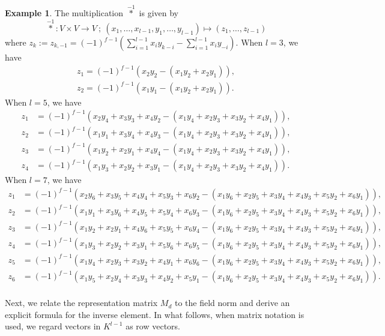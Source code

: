 \documentclass[a4paper, 11pt]{amsart}
\theoremstyle{plain}
\theoremstyle{definition}
\newtheorem{example}[thm]{Example}
\numberwithin{equation}{section}
\begin{document}
\begin{example}
The multiplication $\overset{-1}{\ast}$ is given by 
\[
\overset{-1}{\ast} : V \times V \to V\ ; \ ( x_1 , \dots , x_{l-1}, y_1 , \dots , y_{l-1} ) \mapsto (z_1 , \dots , z_{l-1})
\]
where $z_{k} := z_{k,-1} = (-1)^{f-1}\left(\sum_{i=1}^{l-1}x_{i}y_{k-i} - \sum_{i=1}^{l-1}x_{i}y_{-i}\right)$.
When $l=3$, we have
\begin{align*}
z_{1}
=(-1)^{f-1} (x_2y_2 - (x_1y_2 + x_2y_1)),\\
z_{2}
=(-1)^{f-1} (x_1y_1 - (x_1y_2 + x_2y_1)).
\end{align*}
When $l=5$, we have
\begin{align*}
z_{1}
&=(-1)^{f-1}( x_2y_4 + x_3y_3 + x_4y_2
-(x_1y_4 + x_2y_3 + x_3y_2 + x_4y_1 )),\\
z_{2}
&=(-1)^{f-1}(x_1y_1 + x_3y_4 + x_4y_3
-(x_1y_4 + x_2y_3 + x_3y_2 + x_4y_1 )),\\
z_{3}
&=(-1)^{f-1}(x_1y_2 + x_2y_1 + x_4y_4
-(x_1y_4 + x_2y_3 + x_3y_2 + x_4y_1 )),\\
z_{4}
&=(-1)^{f-1}(x_1y_3 + x_2y_2 + x_3y_1
-(x_1y_4 + x_2y_3 + x_3y_2 + x_4y_1 )).
\end{align*}
When $l=7$, we have
\begin{align*}
z_{1}
&=(-1)^{f-1}( x_2y_6 + x_3y_5 + x_4y_4 + x_5y_3 + x_6y_2
-(x_1y_6 + x_2y_5 + x_3y_4 + x_4y_3 + x_5y_2 + x_6y_1 )),\\
z_{2}
&=(-1)^{f-1}( x_1y_1 +  x_3y_6 + x_4y_5 + x_5y_4 + x_6y_3
-(x_1y_6 + x_2y_5 + x_3y_4 + x_4y_3 + x_5y_2 + x_6y_1 )),\\
z_{3}
&=(-1)^{f-1}( x_1y_2 + x_2y_1 +  x_4y_6 + x_5y_5 + x_6y_4
-(x_1y_6 + x_2y_5 + x_3y_4 + x_4y_3 + x_5y_2 + x_6y_1 )),\\
z_{4}
&=(-1)^{f-1}( x_1y_3 + x_2y_2 + x_3y_1 + x_5y_6 + x_6y_5
-(x_1y_6 + x_2y_5 + x_3y_4 + x_4y_3 + x_5y_2 + x_6y_1 )),\\
z_{5}
&=(-1)^{f-1}( x_1y_4 + x_2y_3 + x_3y_2 + x_4y_1 + x_6y_6
-(x_1y_6 + x_2y_5 + x_3y_4 + x_4y_3 + x_5y_2 + x_6y_1 )),\\
z_{6}
&=(-1)^{f-1}( x_1y_5 + x_2y_4 + x_3y_3 + x_4y_2 + x_5y_1 
-(x_1y_6 + x_2y_5 + x_3y_4 + x_4y_3 + x_5y_2 + x_6y_1 )).\\ 
\end{align*}
\end{example}

Next, we relate the representation matrix $M_d$ to the field norm and derive an explicit formula for the inverse element.
In what follows, when matrix notation is used, we regard vectors in $K^{l-1}$ as row vectors.
\end{document}
